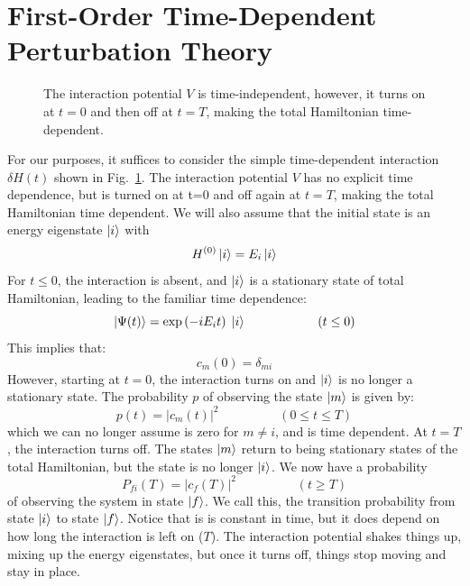 \documentclass[12pt]{article}
\begin{document}
\section{First-Order Time-Dependent Perturbation Theory}

\begin{figure}[thb]
\begin{center}
\end{center}
\caption{\label{fig:simple-perturbation} The interaction potential $V$
  is time-independent, however, it turns on at $t=0$ and then off at
  $t=T$, making the total Hamiltonian time-dependent.}
\end{figure}

For our purposes, it suffices to consider the simple time-dependent
interaction $\delta H(t)$ shown in Fig.~\ref{fig:simple-perturbation}.
The interaction potential $V$ has no explicit time dependence, but is
turned on at t=0 and off again at $t=T$, making the total Hamiltonian
time dependent.  We will also assume that the initial state is an
energy eigenstate $\ket{i}$ with
$$H^{(0)} \ket{i} = E_i \ket{i}$$
For $t \leq 0$, the interaction is absent, and $\ket{i}$ is a stationary state of total Hamiltonian,
leading to the familiar time dependence:
$$\ket{\Psi(t)} = \exp\left( -i E_i t\right) \;
\ket{i} \hspace{2cm} (t \leq 0)$$
This implies that:
\begin{equation*}
c_m(0) = \delta_{mi}
\end{equation*}
However, starting at $t=0$, the interaction turns on and $\ket{i}$ is
no longer a stationary state.  The probability $p$ of observing the
state $\ket{m}$ is given by:
$$p(t) = |c_m(t)|^2 \hspace{2cm} (0 \leq t \leq T)$$ which we can no
longer assume is zero for $m \neq i$, and is time dependent.  At
$t=T$, the interaction turns off.  The states $\ket{m}$ return to
being stationary states of the total Hamiltonian, but the state is no
longer $\ket{i}$.  We now have a probability
$$P_{fi}(T) = |c_f(T)|^2 \hspace{2cm} (t \geq T)$$ of observing the
system in state $\ket{f}$.  We call this, the transition probability
from state $\ket{i}$ to state $\ket{f}$. Notice that is is constant in
time, but it does depend on how long the interaction is left on ($T$).
The interaction potential shakes things up, mixing up the energy
eigenstates, but once it turns off, things stop moving and stay in
place.
\end{document}
